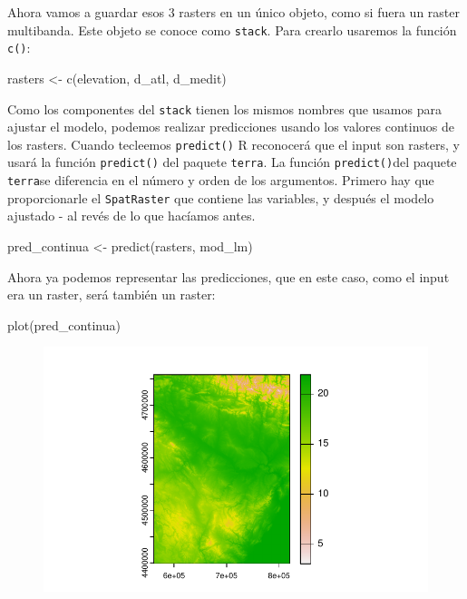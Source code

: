 \documentclass[
  letterpaper,
  DIV=11,
  numbers=noendperiod]{scrreprt}
\newenvironment{Shaded}{\begin{snugshade}}{\end{snugshade}}
\newcommand{\FunctionTok}[1]{\textcolor[rgb]{0.28,0.35,0.67}{#1}}
\newcommand{\NormalTok}[1]{\textcolor[rgb]{0.00,0.23,0.31}{#1}}
\newcommand{\OtherTok}[1]{\textcolor[rgb]{0.00,0.23,0.31}{#1}}
\begin{document}
Ahora vamos a guardar esos 3 rasters en un único objeto, como si fuera
un raster multibanda. Este objeto se conoce como \texttt{stack}. Para
crearlo usaremos la función \texttt{c()}:

\begin{Shaded}
\begin{Highlighting}[]
\NormalTok{rasters }\OtherTok{\textless{}{-}} \FunctionTok{c}\NormalTok{(elevation, d\_atl, d\_medit)}
\end{Highlighting}
\end{Shaded}

Como los componentes del \texttt{stack} tienen los mismos nombres que
usamos para ajustar el modelo, podemos realizar predicciones usando los
valores continuos de los rasters. Cuando tecleemos \texttt{predict()} R
reconocerá que el input son rasters, y usará la función
\texttt{predict()} del paquete \texttt{terra}. La función
\texttt{predict()}del paquete \texttt{terra}se diferencia en el número y
orden de los argumentos. Primero hay que proporcionarle el
\texttt{SpatRaster} que contiene las variables, y después el modelo
ajustado - al revés de lo que hacíamos antes.

\begin{Shaded}
\begin{Highlighting}[]
\NormalTok{pred\_continua }\OtherTok{\textless{}{-}} \FunctionTok{predict}\NormalTok{(rasters, mod\_lm)}
\end{Highlighting}
\end{Shaded}

Ahora ya podemos representar las predicciones, que en este caso, como el
input era un raster, será también un raster:

\begin{Shaded}
\begin{Highlighting}[]
\FunctionTok{plot}\NormalTok{(pred\_continua)}
\end{Highlighting}
\end{Shaded}

\begin{figure}[H]

{\centering \includegraphics{01_RegresionLineal_files/figure-pdf/unnamed-chunk-41-1.pdf}

}

\end{figure}
\end{document}
